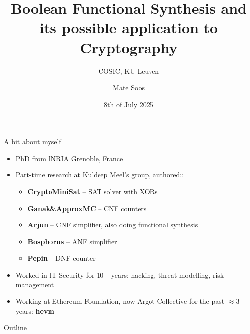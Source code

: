 \documentclass[aspectratio=169]{beamer}
\title[Func. Synthesis]{
Boolean Functional Synthesis and its possible application to Cryptography}
\author[Soos]{Mate Soos}
\institute[Argot]{\large Argot Collective (\url{https://argot.org})}
\date{8th of July 2025}
\subtitle{COSIC, KU Leuven}
\begin{document}
\begin{frame}
    \titlepage
\end{frame}

\begin{frame}{A bit about myself}
\begin{itemize}
\item PhD from INRIA Grenoble, France
\item Part-time research at Kuldeep Meel's group, authored::
    \begin{itemize}
        \item \textbf{CryptoMiniSat} -- SAT solver with XORs
        \item \textbf{Ganak\&ApproxMC} -- CNF counters
        \item \textbf{Arjun} -- CNF simplifier, also doing functional synthesis
        \item \textbf{Bosphorus} -- ANF simplifier
        \item \textbf{Pepin} -- DNF counter
    \end{itemize}
\item Worked in IT Security for 10+ years: hacking,
    threat modelling, risk management
\item Working at Ethereum Foundation, now Argot Collective for the past $\approx3$
    years: \textbf{hevm}
\end{itemize}
\end{frame}

\begin{frame}{Outline}
    \tableofcontents
\end{frame}
\end{document}
